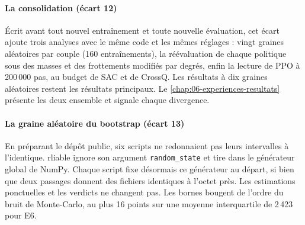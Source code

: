 \paragraph{La consolidation (écart 12)} Écrit avant tout nouvel entraînement et
toute nouvelle évaluation, cet écart ajoute trois analyses avec le même code et les mêmes réglages :
vingt graines aléatoires par couple (160 entraînements), la réévaluation de chaque politique sous
des masses et des frottements modifiés par degrés, enfin la lecture de PPO à 200\,000 pas, au budget
de SAC et de CrossQ. Les résultats à dix graines aléatoires restent les résultats principaux. Le
\cref{chap:06-experiences-resultats} présente les deux ensemble et signale chaque divergence.

\paragraph{La graine aléatoire du bootstrap (écart 13)} En préparant le dépôt public, six scripts ne
redonnaient pas leurs intervalles à l'identique. rliable ignore son argument \texttt{random\_state}
et tire dans le générateur global de NumPy. Chaque script fixe désormais ce générateur au départ, si bien que deux passages donnent des fichiers identiques à l'octet près. Les estimations ponctuelles et les
verdicts ne changent pas. Les bornes bougent de l'ordre du bruit de Monte-Carlo, au plus 16 points
sur une moyenne interquartile de 2\,423 pour E6.

